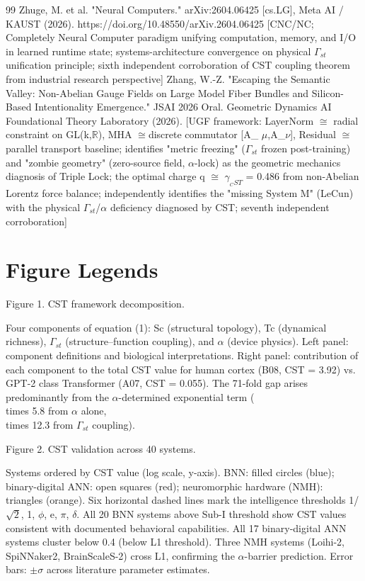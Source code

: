 \documentclass[a4paper,12pt]{article}
\begin{document}
\begin{thebibliography}{99}
 Zhuge, M. et al. "Neural Computers." arXiv:2604.06425 [cs.LG], Meta AI / KAUST (2026). https://doi.org/10.48550/arXiv.2604.06425 [CNC/NC; Completely Neural Computer paradigm unifying computation, memory, and I/O in learned runtime state; systems-architecture convergence on physical $\Gamma_{st}$ unification principle; sixth independent corroboration of CST coupling theorem from industrial research perspective]
 Zhang, W.-Z. "Escaping the Semantic Valley: Non-Abelian Gauge Fields on Large Model Fiber Bundles and Silicon-Based Intentionality Emergence." JSAI 2026 Oral. Geometric Dynamics AI Foundational Theory Laboratory (2026). [UGF framework: LayerNorm $\cong$ radial constraint on GL(k,$\mathbb{R}$), MHA $\cong$discrete commutator [A_{} $\mu$,A_$\nu$], Residual $\cong$ parallel transport baseline; identifies "metric freezing" ($\Gamma_{st}$ frozen post-training) and "zombie geometry" (zero-source field, $\alpha$-lock) as the geometric mechanics diagnosis of Triple Lock; the optimal charge q $\cong$ $\gamma_{_CST}$ = 0.486 from non-Abelian Lorentz force balance; independently identifies the "missing System M" (LeCun) with the physical $\Gamma_{st}$/$\alpha$ deficiency diagnosed by CST; seventh independent corroboration]
\end{thebibliography}

\section*{Figure Legends}
Figure 1. CST framework decomposition.

Four components of equation (1): Sc (structural topology), Tc (dynamical richness), $\Gamma_{st}$ (structure--function coupling), and $\alpha$ (device physics). Left panel: component definitions and biological interpretations. Right panel: contribution of each component to the total CST value for human cortex (B08, CST = 3.92) vs. GPT-2 class Transformer (A07, CST = 0.055). The 71-fold gap arises predominantly from the $\alpha$-determined exponential term ( \\times 5.8 from $\alpha$ alone,  \\times 12.3 from $\Gamma_{st}$ coupling).

Figure 2. CST validation across 40 systems.

Systems ordered by CST value (log scale, y-axis). BNN: filled circles (blue); binary-digital ANN: open squares (red); neuromorphic hardware (NMH): triangles (orange). Six horizontal dashed lines mark the intelligence thresholds {1/$\sqrt{2}$, 1, $\phi$, e, $\pi$, $\delta$}. All 20 BNN systems above Sub-I threshold show CST values consistent with documented behavioral capabilities. All 17 binary-digital ANN systems cluster below 0.4 (below L1 threshold). Three NMH systems (Loihi-2, SpiNNaker2, BrainScaleS-2) cross L1, confirming the $\alpha$-barrier prediction. Error bars: $\pm\sigma$ across literature parameter estimates.
\end{document}
